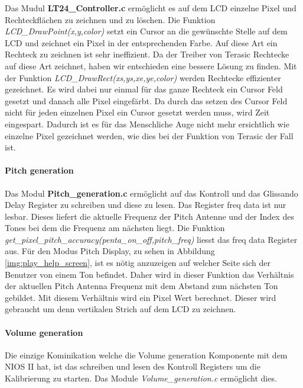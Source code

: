 Das Mudul \textbf{LT24\_Controller.c} ermöglicht es auf dem LCD einzelne Pixel und Rechteckflächen zu zeichnen und zu löschen. Die Funktion \textit{LCD\_DrawPoint(x,y,color)} setzt ein Cursor an die gewünschte Stelle auf dem LCD und zeichnet ein Pixel in der entsprechenden Farbe. Auf diese Art ein Rechteck zu zeichnen ist sehr ineffizient. Da der Treiber von Terasic Rechtecke auf diese Art zeichnet, haben wir entschieden eine bessere Lösung zu finden. Mit der Funktion \textit{LCD\_DrawRect(xs,ys,xe,ye,color)}  werden Rechtecke effizienter gezeichnet. Es wird dabei nur einmal für das ganze Rechteck ein Cursor Feld gesetzt und danach alle Pixel eingefärbt. Da durch das setzen des Cursor Feld nicht für jeden einzelnen Pixel ein Cursor gesetzt werden muss, wird  Zeit eingespart. Dadurch ist es für das Menschliche Auge nicht mehr ersichtlich wie einzelne Pixel gezeichnet werden, wie dies bei der Funktion von Terasic der Fall ist. 

\paragraph{Pitch generation}
Das Modul \textbf{Pitch\_generation.c} ermöglicht auf das Kontroll und das Glissando Delay Register zu schreiben und diese zu lesen. Das Register freq data ist nur lesbar. Dieses liefert die aktuelle Frequenz der Pitch Antenne und der Index des Tones bei dem die Frequenz am nächsten liegt. 
Die Funktion \textit{get\_pixel\_pitch\_accuracy(penta\_on\_off,pitch\_freq)} liesst das freq data Register aus. Für den Modus Pitch Display, zu sehen in Abbildung \ref{img:play_help_screen}, ist es nötig anzuzeigen auf welcher Seite sich der Benutzer von einem Ton befindet. Daher wird in dieser Funktion das Verhältnis der aktuellen Pitch Antenna Frequenz mit dem Abstand zum nächsten Ton gebildet. Mit diesem Verhältnis wird ein Pixel Wert berechnet. Dieser wird gebraucht um denn vertikalen Strich auf dem LCD zu zeichnen.


\paragraph{Volume generation}
Die einzige Kominikation welche die Volume generation Komponente mit dem NIOS II hat, ist das schreiben und lesen des Kontroll Registers um die Kalibrierung zu starten. Das Module  \textit{Volume\_generation.c} ermöglicht dies. 